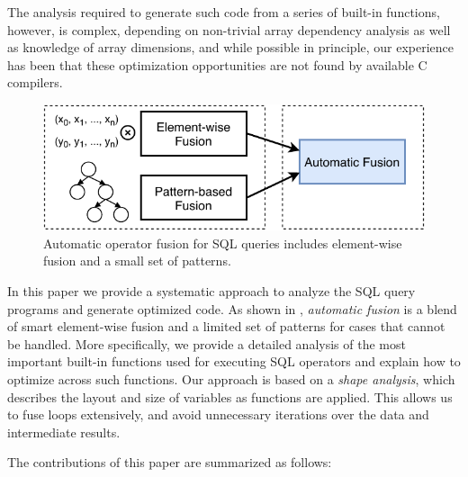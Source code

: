 
\noindent{}The analysis required to generate such code from a series of built-in functions, however, is complex,
depending on non-trivial array dependency analysis as well as knowledge of array dimensions, and 
while possible in principle, our experience has been that these optimization opportunities are not found by available C compilers.

\begin{figure}[htbp]
\centering
\includegraphics[width=.9\columnwidth]{./src/figure/basic-idea.pdf}
\caption{Automatic operator fusion for SQL queries includes element-wise fusion and a small set of patterns.}
\label{fig:fusion_idea}
\end{figure}

In this paper we provide a systematic approach to analyze the SQL query programs
and generate optimized code. As shown in ,
\textit{automatic fusion} is a blend of smart element-wise fusion and a limited set of
patterns for cases that cannot be handled. More specifically, we provide a detailed
analysis of the most important built-in functions used for executing SQL operators
and explain how to optimize across such functions. Our approach is based on a
\textit{shape analysis}, which describes the layout and size of variables as
functions are applied. This allows us to fuse loops extensively, and avoid unnecessary
iterations over the data and intermediate results.  

The contributions of this paper are summarized as follows:

